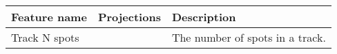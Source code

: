 {
\footnotesize
\centering

\begin{tabular}{p{}|p{}|p{}}

    \toprule
    \textbf{Feature name} &
    \textbf{Projections} &
    \textbf{Description}             
    \\ \midrule

    \multicolumn{2}{l|}{Track N spots} & 
    The number of spots in a track.
    \\ \bottomrule

\end{tabular}
}